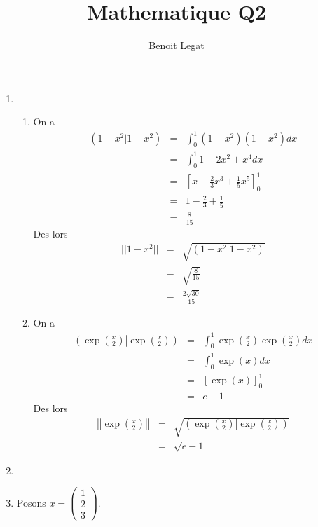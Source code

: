 \documentclass[11pt,a4paper]{article} %
\title{Mathematique Q2}
\author{Benoit Legat}
\begin{document}
\maketitle

\newcommand\dist{\mathrm{dist}}
\newcommand\Ker{\mathrm{Ker}}
\renewcommand\Im{\mathrm{Im}}

\begin{enumerate}
	\item
		\begin{enumerate}
			\item On a
				\begin{eqnarray*}
					(1-x^2|1-x^2) & = & \int_0^1 (1-x^2)(1-x^2) dx\\
					              & = & \int_0^1 1 - 2x^2 + x^4 dx\\
					              & = & \left[x - \frac{2}{3}x^3 + \frac{1}{5}x^5\right]_0^1\\
					              & = & 1 - \frac{2}{3} + \frac{1}{5}\\
					              & = & \frac{8}{15}
				\end{eqnarray*}
				Des lors
				\begin{eqnarray*}
					||1-x^2|| & = & \sqrt{(1-x^2|1-x^2)}\\
					          & = & \sqrt{\frac{8}{15}}\\
					          & = & \frac{2\sqrt{30}}{15}
				\end{eqnarray*}
			\item On a
				\begin{eqnarray*}
					\left(\exp\left(\frac{x}{2}\right)\left|\exp\left(\frac{x}{2}\right)\right.\right)
					& = & \int_0^1 \exp\left(\frac{x}{2}\right)\exp\left(\frac{x}{2}\right) dx\\
					& = & \int_0^1 \exp(x) dx\\
					& = & \left[\exp(x)\right]_0^1\\
					& = & e - 1
				\end{eqnarray*}
				Des lors
				\begin{eqnarray*}
					\left|\left|\exp\left(\frac{x}{2}\right)\right|\right|
					& = & \sqrt{\left(\exp\left(\frac{x}{2}\right)\left|\exp\left(\frac{x}{2}\right)\right.\right)}\\
					& = & \sqrt{e - 1}
				\end{eqnarray*}
		\end{enumerate}
	\item
	\item
		Posons $x = \begin{pmatrix}1\\2\\3\end{pmatrix}$.

\end{enumerate}
\end{document}
